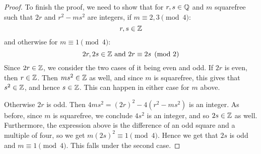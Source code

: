 \begin{proof}
    To finish the proof, we need to show that for $r,s \in \mathbb{Q}$ and $m$ squarefree such that $2r$ and $r^2-ms^2$ are integers, if $m \equiv 2,3 \pmod{4}$:
    \[ r,s \in \mathbb{Z}\]
    and otherwise for $m \equiv 1 \pmod{4}$:
    \[ 2r,2s \in \mathbb{Z} \text{ and } 2r \equiv 2s \pmod{2} \]
    Since $2r \in \mathbb{Z}$, we consider the two cases of it being even and odd. If $2r$ is even, then $r \in \mathbb{Z}$. Then $ms^2 \in \mathbb{Z}$ as well, and since $m$ is squarefree, this gives that $s^2 \in \mathbb{Z}$, and hence $s \in \mathbb{Z}$. This can happen in either case for $m$ above.

    Otherwise $2r$ is odd. Then $4ms^2 = (2r)^2 - 4(r^2-ms^2)$ is an integer. As before, since $m$ is squarefree, we conclude $4s^2$ is an integer, and so $2s \in \mathbb{Z}$ as well. Furthermore, the expression above is the difference of an odd square and a multiple of four, so we get $m(2s)^2 \equiv 1 \pmod{4}$. Hence we get that $2s$ is odd and $m \equiv 1 \pmod{4}$. This falls under the second case.
\end{proof}
